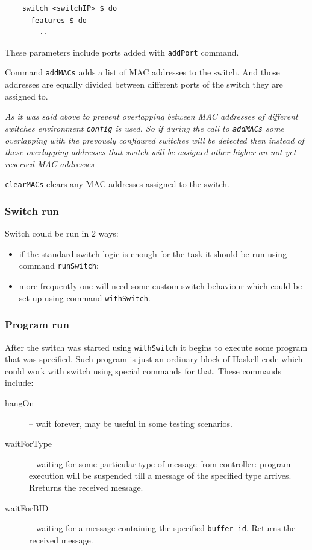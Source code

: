 \documentclass[9pt,a4paper]{article}
\begin{document}
\begin{lstlisting}
    switch <switchIP> $ do
      features $ do
        ..
\end{lstlisting}

These parameters include ports added with \lstinline!addPort! command.

Command \lstinline!addMACs! adds a list of MAC addresses to
the switch. And those addresses are equally divided between different
ports of the switch they are assigned to.

\emph{As it was said above to prevent overlapping between MAC
  addresses of different switches environment \lstinline!config! is
  used. So if during the call to \lstinline!addMACs! some
  overlapping with the prevously configured switches will be detected then
  instead of these overlapping addresses that switch will be assigned
  other higher an not yet reserved MAC addresses}

\lstinline!clearMACs! clears any MAC addresses assigned to the switch.


\subsubsection{Switch run}

Switch could be run in 2 ways:

\begin{itemize}
  \item if the standard switch logic is enough for the task it should be
    run using command \lstinline!runSwitch!;
  \item more frequently one will need some custom switch behaviour which
    could be set up using command \lstinline!withSwitch!.
\end{itemize}


\subsubsection{Program run}

After the switch was started using \lstinline!withSwitch! it begins to
execute some program that was specified. Such program is just an
ordinary block of Haskell code which could work with switch using
special commands for that. These commands include:

\begin{description}
  \item[hangOn] -- wait forever, may be useful in some testing scenarios.

  \item[waitForType] -- waiting for some particular type of message
    from controller: program execution will be suspended till a
    message of the specified type arrives. Rreturns the received message.

  \item[waitForBID] -- waiting for a message containing the specified
    \lstinline!buffer id!.  Returns the received message.

\end{description}
\end{document}
